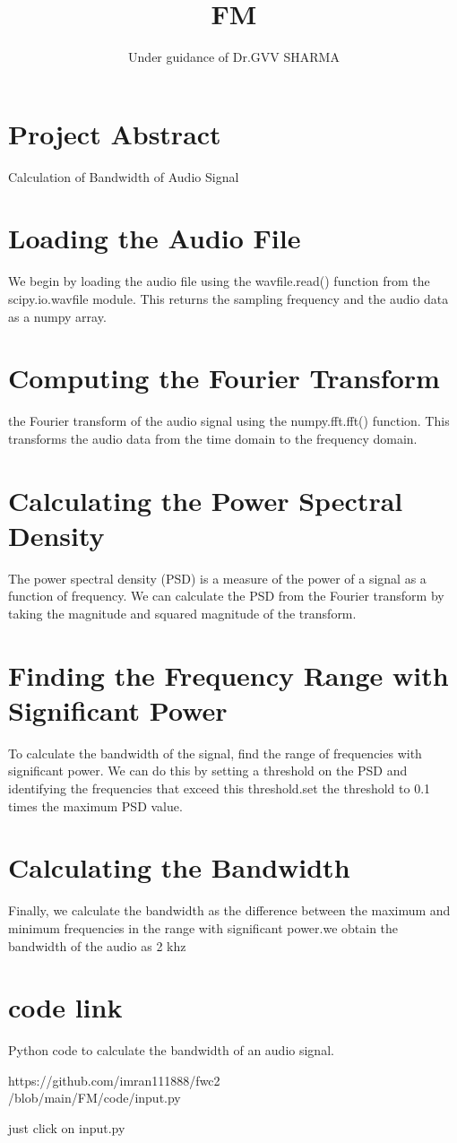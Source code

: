 \documentclass[journal,12pt,twocolumn]{article}
\title{FM}
\author{Under guidance of Dr.GVV SHARMA}
\begin{document}
\maketitle
\tableofcontents
\section{Project Abstract}
Calculation of Bandwidth of Audio Signal
\section{Loading the Audio File}
We begin by loading the audio file using the wavfile.read() function from the scipy.io.wavfile module. This returns the sampling frequency and the audio data as a numpy array.
\section{Computing the Fourier Transform}
the Fourier transform of the audio signal using the numpy.fft.fft() function. This transforms the audio data from the time domain to the frequency domain.
\section{Calculating the Power Spectral Density}
The power spectral density (PSD) is a measure of the power of a signal as a function of frequency. We can calculate the PSD from the Fourier transform by taking the magnitude and squared magnitude of the transform.
\section{Finding the Frequency Range with Significant Power}
To calculate the bandwidth of the signal,  find the range of frequencies with significant power. We can do this by setting a threshold on the PSD and identifying the frequencies that exceed this threshold.set the threshold to 0.1 times the maximum PSD value.
\section{Calculating the Bandwidth}
Finally, we calculate the bandwidth as the difference between the maximum and minimum frequencies in the range with significant power.we obtain the bandwidth of the audio as 2 khz
\section{code link}
Python code to calculate the bandwidth of an audio signal.\\


\begin{mdframed}
https://github.com/imran111888/fwc2\\
/blob/main/FM/code/input.py

\end{mdframed}
just click on input.py \\

\end{document}
